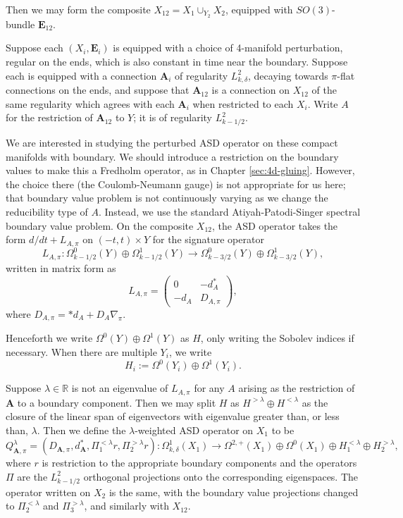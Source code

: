 \documentclass{memo-l}
\theoremstyle{definition}
\theoremstyle{remark}
\numberwithin{section}{chapter}
\numberwithin{equation}{chapter}
\begin{document}
Then we may form the composite $X_{12} = X_1 \cup_{Y_2} X_2$, equipped with $SO(3)$-bundle $\mathbf{E}_{12}$.

Suppose each $(X_i, \mathbf{E}_i)$ is equipped with a choice of 4-manifold perturbation, regular on the ends, which is also constant in time near the boundary. Suppose each is equipped with a connection $\mathbf{A}_i$ of regularity $L^2_{k,\delta}$, decaying towards $\pi$-flat connections on the ends, and suppose that $\mathbf{A}_{12}$ is a connection on $X_{12}$ of the same regularity which agrees with each $\mathbf{A}_i$ when restricted to each $X_i$. Write $A$ for the restriction of $\mathbf{A}_{12}$ to $Y$; it is of regularity $L^2_{k-1/2}$.

We are interested in studying the perturbed ASD operator on these compact manifolds with boundary. We should introduce a restriction on the boundary values to make this a Fredholm operator, as in Chapter \ref{sec:4d-gluing}. However, the choice there (the Coulomb-Neumann gauge) is not appropriate for us here; that boundary value problem is not continuously varying as we change the reducibility type of $A$. Instead, we use the standard Atiyah-Patodi-Singer spectral boundary value problem. On the composite $X_{12}$, the ASD operator takes the form $d/dt + L_{A,\pi}$ on $(-t, t) \times Y$ for the signature operator $$L_{A,\pi}: \Omega^0_{k-1/2}(Y) \oplus \Omega^1_{k-1/2}(Y) \to \Omega^0_{k-3/2}(Y) \oplus \Omega^1_{k-3/2}(Y),$$ written in matrix form as $$L_{A,\pi} = \begin{pmatrix}0 & -d_A^* \\ -d_A & D_{A,\pi}\end{pmatrix},$$ where $D_{A,\pi} = *d_A + D_A \nabla_\pi$. 

Henceforth we write $\Omega^0(Y) \oplus \Omega^1(Y)$ as $H$, only writing the Sobolev indices if necessary. When there are multiple $Y_i$, we write $$H_i := \Omega^0(Y_i) \oplus \Omega^1(Y_i).$$

Suppose $\lambda \in \mathbb R$ is not an eigenvalue of $L_{A,\pi}$ for any $A$ arising as the restriction of $\mathbf{A}$ to a boundary component. Then we may split $H$ as $H^{>\lambda} \oplus H^{< \lambda}$ as the closure of the linear span of eigenvectors with eigenvalue greater than, or less than, $\lambda$. Then we define the $\lambda$-weighted ASD operator on $X_1$ to be 
$$Q^\lambda_{\mathbf{A},\pi} = (D_{\mathbf{A},\pi}, d^*_{\mathbf{A}}, \Pi^{< \lambda}_1r, \Pi^{> \lambda}_2r): \Omega^1_{k,\delta}(X_1) \to \Omega^{2,+}(X_1) \oplus \Omega^0(X_1) \oplus H_1^{< \lambda} \oplus H_2^{> \lambda},$$ 
where $r$ is restriction to the appropriate boundary components and the operators $\Pi$ are the $L^2_{k-1/2}$ orthogonal projections onto the corresponding eigenspaces. The operator written on $X_2$ is the same, with the boundary value projections changed to $\Pi^{<\lambda}_2$ and $\Pi^{> \lambda}_3$, and similarly with $X_{12}$.
\end{document}
